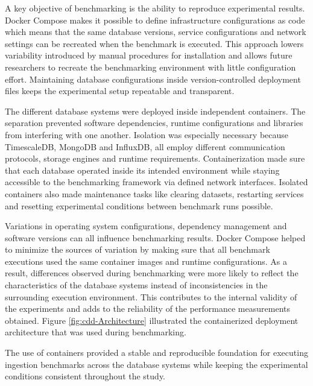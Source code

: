 A key objective of benchmarking is the ability to reproduce experimental results. Docker Compose makes it possible to define infrastructure configurations as code which means that the same database versions, service configurations and network settings can be recreated when the benchmark is executed. This approach lowers variability introduced by manual procedures for installation and allows future researchers to recreate the benchmarking environment with little configuration effort. Maintaining database configurations inside version-controlled deployment files keeps the experimental setup repeatable and transparent. 

The different database systems were deployed inside independent containers. The separation prevented software dependencies, runtime configurations and libraries from interfering with one another. Isolation was especially necessary because TimescaleDB, MongoDB and InfluxDB, all employ different communication protocols, storage engines and runtime requirements. Containerization made sure that each database operated inside its intended environment while staying accessible to the benchmarking framework via defined network interfaces. Isolated containers also made maintenance tasks like clearing datasets, restarting services and resetting experimental conditions between benchmark runs possible. 



Variations in operating system configurations, dependency management and software versions can all influence benchmarking results. Docker Compose helped to minimize the sources of variation by making sure that all benchmark executions used the same container images and runtime configurations. As a result, differences observed during benchmarking were more likely to reflect the characteristics of the database systems instead of inconsistencies in the surrounding execution environment. This contributes to the internal validity of the experiments and adds to the reliability of the performance measurements obtained. Figure \ref{fig:cdd-Architecture} illustrated the containerized deployment architecture that was used during benchmarking.

The use of containers provided a stable and reproducible foundation for executing ingestion benchmarks across the database systems while keeping the experimental conditions consistent throughout the study.







